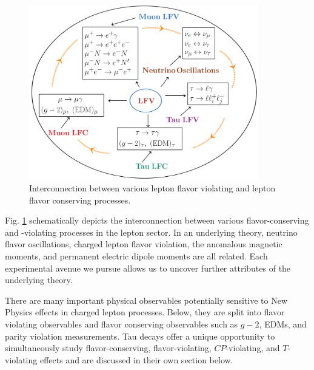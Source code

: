 \begin{figure}[t!]
\begin{center}
\includegraphics[width=10cm]{ChargedLeptons/Figures/chart.pdf}
\caption{\label{CL:chart}Interconnection between various lepton flavor violating and  lepton flavor conserving processes.}
\end{center}
\end{figure}

Fig. \ref{CL:chart} schematically depicts the interconnection between
various flavor-conserving and -violating processes in the lepton
sector.  In an underlying theory, neutrino flavor oscillations,
charged lepton flavor violation,  the anomalous magnetic moments, and permanent electric
dipole moments are all related.  Each experimental avenue we pursue allows us to uncover further attributes of the underlying theory. 

There are many important physical observables potentially sensitive to
New Physics effects in charged lepton processes. Below, they are  split into  flavor violating observables and flavor conserving observables  such as $g-2$, EDMs, and parity violation measurements. Tau decays offer a unique opportunity to simultaneously study flavor-conserving, flavor-violating, $C\!P$-violating,  and $T$-violating effects and are discussed in
 their own section below.